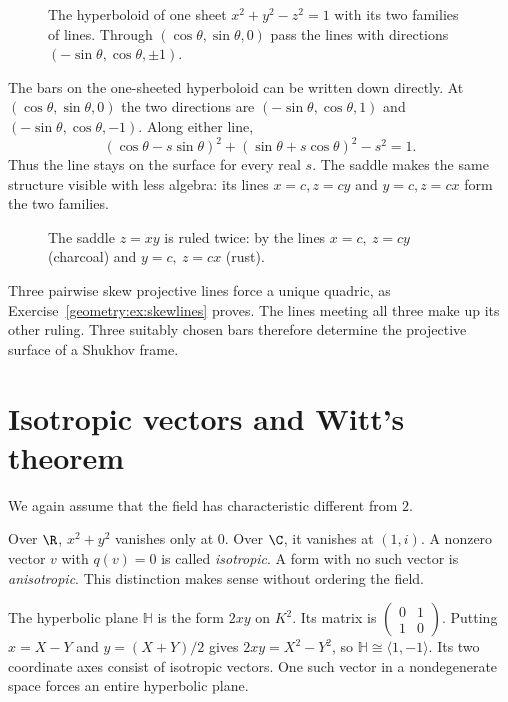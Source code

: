 \begin{figure}[ht]
\centering
{}
\caption{The hyperboloid of one sheet $x^2+y^2-z^2=1$ with its two families of lines. Through $(\cos\theta,\sin\theta,0)$ pass the lines with directions
$(-\sin\theta,\cos\theta,\pm1)$.}
\label{geometry:fig:hyperboloid}
\end{figure}

The bars on the one-sheeted hyperboloid can be written down directly.
At $(\cos\theta,\sin\theta,0)$ the two directions are
$(-\sin\theta,\cos\theta,1)$ and $(-\sin\theta,\cos\theta,-1)$.
Along either line,
\[
 (\cos\theta-s\sin\theta)^2+(\sin\theta+s\cos\theta)^2-s^2=1.
\]
Thus the line stays on the surface for every real $s$.
The saddle makes the same structure visible with less algebra: its lines
$x=c,z=cy$ and $y=c,z=cx$ form the two families.

\begin{figure}[ht]
\centering
{}
\caption{The saddle $z=xy$ is ruled twice: by the lines $x=c,\ z=cy$ (charcoal) and $y=c,\ z=cx$ (rust).}
\label{geometry:fig:saddle}
\end{figure}

\begin{beauty}
Three pairwise skew projective lines force a unique quadric, as
Exercise~\ref{geometry:ex:skewlines} proves. The lines meeting all three
make up its other ruling. Three suitably chosen bars therefore determine
the projective surface of a Shukhov frame.
\end{beauty}

\section{Isotropic vectors and Witt's theorem}

We again assume that the field has characteristic different from $2$.

Over $\R$, $x^2+y^2$ vanishes only at $0$. Over $\C$, it vanishes at
$(1,i)$. A nonzero vector $v$ with $q(v)=0$ is called \emph{isotropic}.
A form with no such vector is \emph{anisotropic}. This distinction makes
sense without ordering the field.

The hyperbolic plane $\mathbb H$ is the form $2xy$ on $K^2$.
Its matrix is $\left(\begin{smallmatrix}0&1\\1&0\end{smallmatrix}\right)$.
Putting $x=X-Y$ and $y=(X+Y)/2$ gives $2xy=X^2-Y^2$, so
$\mathbb H\cong\langle1,-1\rangle$. Its two coordinate axes consist
of isotropic vectors. One such vector in a nondegenerate space forces
an entire hyperbolic plane.

